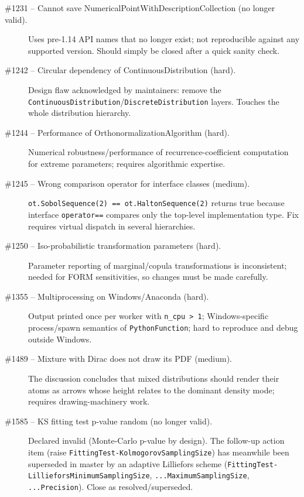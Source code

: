 \documentclass[a4paper,11pt]{article}
\begin{document}
\begin{description}
  \item[\#1231 -- Cannot save NumericalPointWithDescriptionCollection (no longer valid).]
        Uses pre-1.14 API names that no longer exist; not reproducible against
        any supported version. Should simply be closed after a quick sanity check.
  \item[\#1242 -- Circular dependency of ContinuousDistribution (hard).]
        Design flaw acknowledged by maintainers: remove the
        \texttt{ContinuousDistribution}/\texttt{DiscreteDistribution} layers.
        Touches the whole distribution hierarchy.
  \item[\#1244 -- Performance of OrthonormalizationAlgorithm (hard).]
        Numerical robustness/performance of recurrence-coefficient computation
        for extreme parameters; requires algorithmic expertise.
  \item[\#1245 -- Wrong comparison operator for interface classes (medium).]
        \texttt{ot.SobolSequence(2) == ot.HaltonSequence(2)} returns true because
        interface \texttt{operator==} compares only the top-level implementation
        type. Fix requires virtual dispatch in several hierarchies.
  \item[\#1250 -- Iso-probabilistic transformation parameters (hard).]
        Parameter reporting of marginal/copula transformations is inconsistent;
        needed for FORM sensitivities, so changes must be made carefully.
  \item[\#1355 -- Multiprocessing on Windows/Anaconda (hard).]
        Output printed once per worker with \texttt{n\_cpu > 1}; Windows-specific
        process/spawn semantics of \texttt{PythonFunction}; hard to reproduce
        and debug outside Windows.
  \item[\#1489 -- Mixture with Dirac does not draw its PDF (medium).]
        The discussion concludes that mixed distributions should render their
        atoms as arrows whose height relates to the dominant density mode;
        requires drawing-machinery work.
  \item[\#1585 -- KS fitting test p-value random (no longer valid).]
        Declared invalid (Monte-Carlo p-value by design). The follow-up action
        item (raise \texttt{FittingTest-KolmogorovSamplingSize}) has meanwhile
        been superseded in master by an adaptive Lilliefors scheme
        (\texttt{FittingTest-LillieforsMinimumSamplingSize},
        \texttt{...MaximumSamplingSize}, \texttt{...Precision}). Close as
        resolved/superseded.
\end{description}
\end{document}
